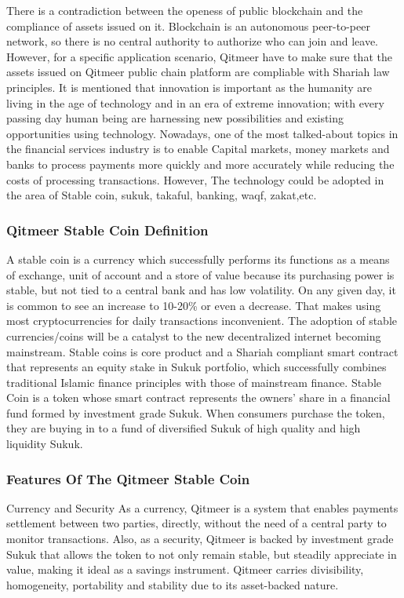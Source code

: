 \documentclass[a4paper,11pt]{article}
\begin{document}
There is a contradiction between the openess of public blockchain and the compliance of assets issued on it. Blockchain is an autonomous peer-to-peer network, so there is no central authority to authorize who can join and leave. However, for a specific application scenario, Qitmeer have to make sure that the assets issued on Qitmeer public chain platform are compliable with Shariah law principles. It is mentioned that innovation is important as the humanity are living in the age of technology and in an era of extreme innovation; with every passing day human being are harnessing new possibilities and existing opportunities using technology. Nowadays, one of the most talked-about topics in the financial services industry is to enable Capital markets, money markets and banks to process payments more quickly and more accurately while reducing the costs of processing transactions. However, The technology could be adopted in the area of Stable coin, sukuk, takaful, banking, waqf, zakat,etc.

\subsubsection{Qitmeer Stable Coin Definition}

A stable coin is a currency which successfully performs its functions as a means of exchange, unit of account and a store of value because its purchasing power is stable, but not tied to a central bank and has low volatility. On any given day, it is common to see an increase to 10-20\% or even a decrease. That makes using most cryptocurrencies for daily transactions inconvenient. The adoption of stable currencies/coins will be a catalyst to the new decentralized internet becoming mainstream.
Stable coins is  core product and a Shariah compliant smart contract that represents an equity stake in Sukuk portfolio, which successfully combines traditional Islamic finance principles with those of mainstream finance. Stable Coin is a token whose smart contract represents the owners’ share in a financial fund formed by investment grade Sukuk. When consumers purchase the token, they are buying in to a fund of diversified Sukuk of high quality and high liquidity Sukuk.


\subsubsection{Features Of The Qitmeer Stable Coin}
 
Currency and  Security As a currency, Qitmeer is a system that enables payments settlement between two parties, directly, without the need of a central party to monitor transactions. Also, as a security, Qitmeer is backed by investment grade Sukuk that allows the token to not only remain stable, but steadily appreciate in value, making it ideal as a savings instrument. Qitmeer carries divisibility, homogeneity, portability and stability due to its asset-backed nature.
\end{document}
